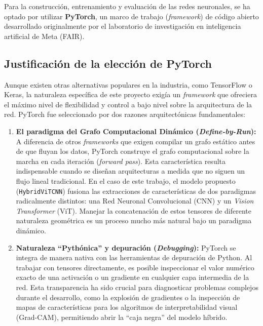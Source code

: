 Para la construcción, entrenamiento y evaluación de las redes neuronales, se ha optado por utilizar \textbf{PyTorch}, un marco de trabajo (\textit{framework}) de código abierto desarrollado originalmente por el laboratorio de investigación en inteligencia artificial de Meta (FAIR).

\subsection{Justificación de la elección de PyTorch}

Aunque existen otras alternativas populares en la industria, como TensorFlow o Keras, la naturaleza específica de este proyecto exigía un \textit{framework} que ofreciera el máximo nivel de flexibilidad y control a bajo nivel sobre la arquitectura de la red. PyTorch fue seleccionado por dos razones arquitectónicas fundamentales:

\begin{enumerate}
	\item \textbf{El paradigma del Grafo Computacional Dinámico (\textit{Define-by-Run}):} A diferencia de otros \textit{frameworks} que exigen compilar un grafo estático antes de que fluyan los datos, PyTorch construye el grafo computacional sobre la marcha en cada iteración (\textit{forward pass}). Esta característica resulta indispensable cuando se diseñan arquitecturas a medida que no siguen un flujo lineal tradicional. En el caso de este trabajo, el modelo propuesto (\texttt{HybridViTCNN}) fusiona las extracciones de características de dos paradigmas radicalmente distintos: una Red Neuronal Convolucional (CNN) y un \textit{Vision Transformer} (ViT). Manejar la concatenación de estos tensores de diferente naturaleza geométrica es un proceso mucho más natural bajo un paradigma dinámico.
	
	\item \textbf{Naturaleza ``Pythónica'' y depuración (\textit{Debugging}):} PyTorch se integra de manera nativa con las herramientas de depuración de Python. Al trabajar con tensores directamente, es posible inspeccionar el valor numérico exacto de una activación o un gradiente en cualquier capa intermedia de la red. Esta transparencia ha sido crucial para diagnosticar problemas complejos durante el desarrollo, como la explosión de gradientes o la inspección de mapas de características para los algoritmos de interpretabilidad visual (Grad-CAM), permitiendo abrir la ``caja negra'' del modelo híbrido.
\end{enumerate}

